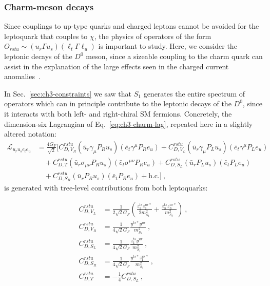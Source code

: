 \subsubsection{Charm-meson decays}

Since couplings to up-type quarks and charged leptons cannot be avoided for the
leptoquark that couples to $\chi$, the physics of operators of the form
$O_{rstu} \sim (u_r \Gamma u_s)(\ell_t \Gamma \ell_u)$ is important to study.
Here, we consider the leptonic decays of the $D^0$ meson, since a sizeable
coupling to the charm quark can assist in the explanation of the large effects
seen in the charged current anomalies~\cite{Fajfer:2015mia}.

In Sec.~\ref{sec:ch3-constraints} we saw that $S_{1}$ generates the entire
spectrum of operators which can in principle contribute to the leptonic decays
of the $D^0$, since it interacts with both left- and right-chiral SM fermions.
Concretely, the dimension-six Lagrangian of Eq.~\eqref{eq:ch3-charm-lag},
repeated here in a slightly altered notation:
\begin{equation}
  \begin{split}
    \mathcal{L}_{u_r u_s e_t e_u}
    &= \frac{4 G_F}{\sqrt{2}} \bigg[  C^{rstu}_{D,V_{R}}  (\bar{u}_r \gamma_\mu P_R u_s)(\bar{e}_t \gamma^\mu P_R e_u) + C_{D,V_{L}}^{rstu} (\bar{u}_r \gamma_\mu P_L u_s)(\bar{e}_t \gamma^\mu P_L e_u)\\ &\quad + C_{D,T}^{rstu} (\bar{u}_r \sigma_{\mu\nu} P_R u_s)(\bar{e}_t \sigma^{\mu\nu} P_R e_u) + C_{D,S_L}^{rstu} (\bar{u}_r P_L u_s)(\bar{e}_t P_L e_u)\\ &\quad + C_{D,S_R}^{rstu}(\bar{u}_r P_R u_s)(\bar{e}_t P_R e_u) + \text{h.c.}
    \bigg] \ ,
  \end{split}
\end{equation}
is generated with tree-level contributions from both leptoquarks:

\begin{align}
  C_{D,V_L}^{rstu} &= \frac{1}{2\sqrt{2} G_F} \left(\frac{z^{ts}_{1} z^{ur*}_{1}}{2m_{S_{1}}^2} + \frac{z_{3}^{ts} z_{3}^{ur*}}{m_{S_{3}}^2} \right) \ , \\
  C_{D,V_R}^{rstu} &= \frac{1}{4\sqrt{2} G_F} \frac{y^{ts*} y^{ur}}{m_{S_{1}}^2} \ , \\
  C_{D,S_L}^{rstu} &= \frac{1}{4\sqrt{2} G_F} \frac{z_{1}^{ts}y^{ur}}{m_{S_{1}}^2} \ , \\
  C_{D,S_R}^{rstu} &= \frac{1}{4\sqrt{2} G_F} \frac{y^{ts*} z^{ur*}_{1}}{m_{S_{1}}^2} \ , \\
  C_{D,T}^{rstu} &= -\frac{1}{4} C^{rstu}_{D,S_L} \ ,
\end{align}

